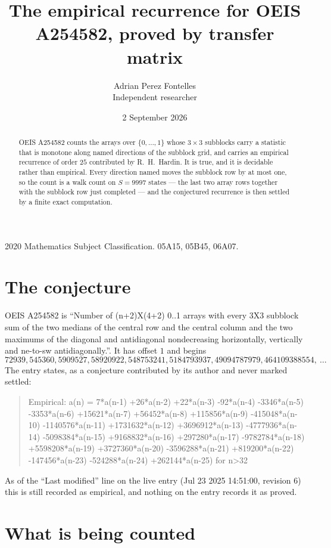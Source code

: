 \documentclass[11pt,a4paper]{article}
\title{The empirical recurrence for OEIS A254582, proved by transfer matrix}
\author{Adrian Perez Fontelles\\ \small Independent researcher}
\date{2 September 2026}
\theoremstyle{plain}
\theoremstyle{definition}
\begin{document}
\maketitle

\begin{abstract}
OEIS A254582 counts the arrays over $\{0,\dots,1\}$ whose $3\times3$ subblocks carry a
statistic that is monotone along named directions of the subblock grid, and carries an
empirical recurrence of order $25$ contributed by R.~H.~Hardin. It is true, and it is
decidable rather than empirical. Every direction named moves the subblock row by at most one,
so the count is a walk count on $S=9997$ states --- the last two array rows together with the
subblock row just completed --- and the conjectured recurrence is then settled by a finite
exact computation.
\end{abstract}

\noindent\small 2020 Mathematics Subject Classification. 05A15, 05B45, 06A07.\normalsize

\section{The conjecture}

OEIS A254582 is ``Number of (n+2)X(4+2) 0..1 arrays with every 3X3 subblock sum of the two medians of the central row and the central column and the two maximums of the diagonal and antidiagonal nondecreasing horizontally, vertically and ne-to-sw antidiagonally.''. It has offset $1$ and begins
\[
72939, 545360, 5909527, 58920922, 548753241, 5184793937, 49094787979, 464109388554,\ \dots
\]
The entry states, as a conjecture contributed by its author and never marked settled:
\begin{quote}
Empirical: a(n) = 7*a(n-1) +26*a(n-2) +22*a(n-3) -92*a(n-4) -3346*a(n-5) -3353*a(n-6) +15621*a(n-7) +56452*a(n-8) +115856*a(n-9) -415048*a(n-10) -1140576*a(n-11) +1731632*a(n-12) +3696912*a(n-13) -4777936*a(n-14) -5098384*a(n-15) +9168832*a(n-16) +297280*a(n-17) -9782784*a(n-18) +5598208*a(n-19) +3727360*a(n-20) -3596288*a(n-21) +819200*a(n-22) -147456*a(n-23) -524288*a(n-24) +262144*a(n-25) for n>32
\end{quote}
As of the ``Last modified'' line on the live entry (Jul 23 2025 14:51:00, revision 6) this is still
recorded as empirical, and nothing on the entry records it as proved.

\section{What is being counted}
\end{document}
